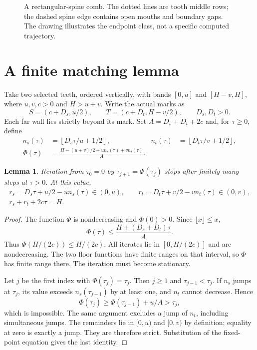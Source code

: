 \documentclass[11pt]{article}
\newtheorem{lemma}[theorem]{Lemma}
\theoremstyle{definition}
\begin{document}
\begin{figure}[htbp]\centering
{}
\caption{A rectangular-spine comb. The dotted lines are tooth middle rows; the dashed spine edge contains open mouths and boundary gaps. The drawing illustrates the endpoint class, not a specific computed trajectory.}
\end{figure}

\section{A finite matching lemma}
Take two selected teeth, ordered vertically, with bands $[0,u]$ and $[H-v,H]$, where $u,v,c>0$ and $H>u+v$. Write the actual marks as
\[
 S=(c+D_s,u/2),\qquad T=(c+D_t,H-v/2),\qquad D_s,D_t>0.
\]
Each far wall lies strictly beyond its mark. Set $A=D_s+D_t+2c$ and, for $\tau\ge0$, define
\begin{align*}
 n_s(\tau)&=\left\lfloor D_s\tau/u+1/2\right\rfloor,&
 n_t(\tau)&=\left\lfloor D_t\tau/v+1/2\right\rfloor,\\
 \Phi(\tau)&=\frac{H-(u+v)/2+u n_s(\tau)+v n_t(\tau)}{A}.
\end{align*}

\begin{lemma}\label{lem:matching}
Iteration from $\tau_0=0$ by $\tau_{j+1}=\Phi(\tau_j)$ stops after finitely many steps at $\tau>0$. At this value,
\begin{gather*}
 r_s=D_s\tau+u/2-u n_s(\tau)\in(0,u),\qquad
 r_t=D_t\tau+v/2-v n_t(\tau)\in(0,v),\\
 r_s+r_t+2c\tau=H.
\end{gather*}
\end{lemma}
\begin{proof}
The function $\Phi$ is nondecreasing and $\Phi(0)>0$. Since $\lfloor x\rfloor\le x$,
\[
 \Phi(\tau)\le \frac{H+(D_s+D_t)\tau}{A}.
\]
Thus $\Phi(H/(2c))\le H/(2c)$. All iterates lie in $[0,H/(2c)]$ and are nondecreasing. The two floor functions have finite ranges on that interval, so $\Phi$ has finite range there. The iteration must become stationary.

Let $j$ be the first index with $\Phi(\tau_j)=\tau_j$. Then $j\ge1$ and $\tau_{j-1}<\tau_j$. If $n_s$ jumps at $\tau_j$, its value exceeds $n_s(\tau_{j-1})$ by at least one, and $n_t$ cannot decrease. Hence
\[
 \Phi(\tau_j)\ge\Phi(\tau_{j-1})+u/A>\tau_j,
\]
which is impossible. The same argument excludes a jump of $n_t$, including simultaneous jumps. The remainders lie in $[0,u)$ and $[0,v)$ by definition; equality at zero is exactly a jump. They are therefore strict. Substitution of the fixed-point equation gives the last identity.
\end{proof}
\end{document}
